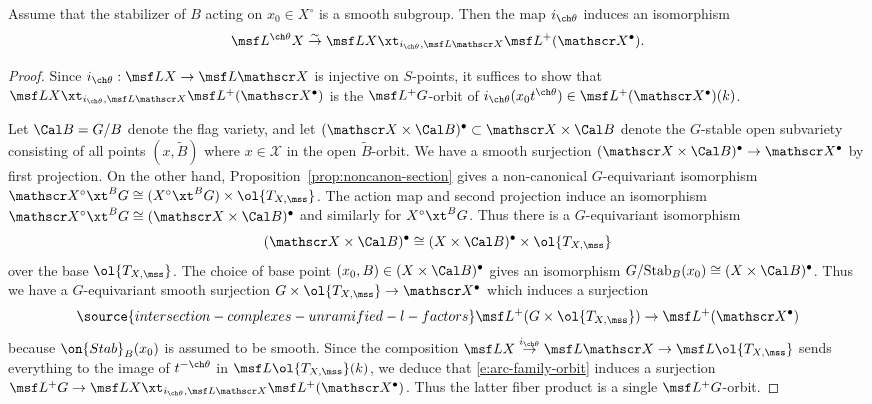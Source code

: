 \begin{lem}
\notready  \label{lem:theta-orbit-identification}
Assume that the stabilizer of $B$ acting on $x_0 \in X^\circ$ is a smooth subgroup.
Then the map $i_{\ch\theta}$ induces an isomorphism
\[ \msf L^{\ch\theta} X \overset\sim\to \msf L X \xt_{i_{\ch\theta}, \msf L \mathscr X} \msf L^+(\mathscr X^\bullet).
\]
\end{lem}
\begin{proof}
Since $i_{\ch\theta} : \msf L X \to \msf L \mathscr X$ is injective on $S$-points,
it suffices to show that
$\msf L X \xt_{i_{\ch\theta}, \msf L \mathscr X} \msf L^+(\mathscr X^\bullet)$
is the $\msf L^+G$-orbit of $i_{\ch\theta}(x_0 t^{\ch\theta}) \in \msf L^+(\mathscr X^\bullet)(k)$.

Let $\Cal B = G/B$ denote the flag variety, and let
$(\mathscr X \times \Cal B)^\bullet \subset \mathscr X \times \Cal B$ denote
the $G$-stable open subvariety
consisting of all points $(x,\tilde B)$ where $x \in \mathscr X$ in the open $\tilde B$-orbit.
We have a smooth surjection $(\mathscr X\times \Cal B)^\bullet \to \mathscr X^\bullet$ by
first projection.
On the other hand, Proposition~\ref{prop:noncanon-section}
gives a non-canonical $G$-equivariant isomorphism
$\mathscr X^\circ \xt^B G \cong (X^\circ \xt^B G) \times \ol{T_{X,\mss}}$.
The action map and second projection induce an isomorphism
$\mathscr X^\circ \xt^B G \cong (\mathscr X \times \Cal B)^\bullet$ and
similarly for $X^\circ \xt^B G$.
Thus there is a $G$-equivariant
isomorphism
\[ (\mathscr X\times \Cal B)^\bullet \cong (X \times \Cal B)^\bullet \times \ol{T_{X,\mss}} \]
over the base $\ol{T_{X,\mss}}$.
The choice of base point $(x_0,B) \in (X \times \Cal B)^\bullet$ gives
an isomorphism $G/\textnormal{Stab}_B(x_0) \cong (X \times \Cal B)^\bullet$.
Thus we have a $G$-equivariant smooth surjection
$G \times \ol{T_{X,\mss}} \to \mathscr X^\bullet$ which induces
a surjection
\begin{equation} \label{e:arc-family-orbit}
\source{intersection-complexes-unramified-l-factors}
    \msf L^+( G \times \ol{T_{X,\mss}} ) \to \msf L^+ (\mathscr X^\bullet)
\end{equation}
because $\on{Stab}_B(x_0)$ is assumed to be smooth.
Since the composition
$\msf L X \overset{i_{\ch\theta}}\to \msf L \mathscr X \to \msf L \ol{T_{X,\mss}}$
sends everything to the image of $t^{-\ch\theta}$ in $\msf L\ol{T_{X,\mss}}(k)$,
we deduce that \eqref{e:arc-family-orbit} induces a
surjection
$\msf L^+G \to \msf L X \xt_{i_{\ch\theta}, \msf L \mathscr X} \msf L^+(\mathscr X^\bullet)$.
Thus the latter fiber product is a single $\msf L^+G$-orbit.
\end{proof}

